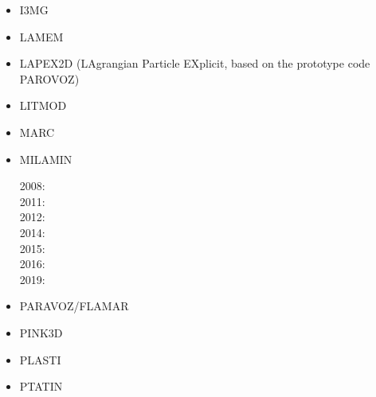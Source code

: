 \begin{itemize}
\item I3MG
\cite{facc14}

\item LAMEM
\cite{scbe08}
\cite{kamm10}
\cite{lemk11}
\cite{may12}
\cite{lesh14}
\cite{cokm14}
\cite{bakp14}
\cite{feka14a}
\cite{feka14b}
\cite{puka15}
\cite{feka15}
\cite{cofk15}
\cite{kapb16}

\item LAPEX2D (LAgrangian Particle EXplicit, based on the prototype code PAROVOZ) 
\cite{sopg05}
\cite{bbeg06}\cite{basv06}
\cite{baso08}
\cite{scbe08}
\cite{sosk11}


\item LITMOD
\cite{afrf07}
\cite{affr08}
\cite{fuac09}
\cite{fufa10}


\item MARC
\cite{nesg97}
\cite{nesb99}


\item MILAMIN

2008: \cite{daks08}\\
2011: \cite{yakm11}\\
2012: \cite{gebk12}\\
2014: \cite{jobk14}\\
2015: \cite{lukz15}\cite{gehm15}\cite{thkp15}\cite{musd15}\\
2016: \cite{jads16}\cite{maka16}\\
2019: \cite{anpa19}


\item PARAVOZ/FLAMAR
\cite{poli93}
\cite{bujl01}\cite{bupo01}
\cite{bast02}\cite{clbb02}
\cite{hags03}\cite{gehd03}
\cite{guhl04}\cite{gewi04}\cite{toba04}\cite{tibb04}
\cite{bugu05}
\cite{yaab07}\cite{buto07}
\cite{yaba08}\cite{tibb08}
\cite{gecm09}\cite{yahb09}
\cite{anwb12}\cite{gech12}\cite{gubc12}\cite{gerb12}\cite{fagm12}
\cite{frba14}\cite{gagb14}\cite{bufa14}
\cite{wulc15}\cite{marl15}\cite{gebw15}\cite{svlh15}




\item PINK3D
\cite{vosc15}


\item PLASTI
\cite{fuwb06}



\item PTATIN
\cite{phil13}
\cite{mabl14}
\cite{mabl15}
\cite{lemh17}
\cite{jolp18}
\cite{jolm19}



\end{itemize}
